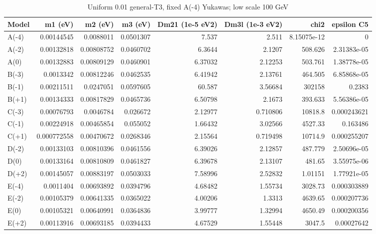 \begin{table}[htbp]
\centering
\small
\caption{Uniform 0.01 general-T3, fixed A(-4) Yukawas; low scale 100 GeV}
\label{tab:table_C2_Am4}
\begin{tabular}{lrrrrrrr}
\hline
Model & m1 (eV) & m2 (eV) & m3 (eV) & Dm21 (1e-5 eV2) & Dm3l (1e-3 eV2) & chi2 & epsilon C5 \\
\hline
A(-4) & 0.00144545 & 0.0088011 & 0.0501307 & 7.537 & 2.511 & 8.15075e-12 & 0 \\
A(-2) & 0.00132818 & 0.00808752 & 0.0460702 & 6.3644 & 2.1207 & 508.626 & 2.31383e-05 \\
A(0) & 0.00132883 & 0.00809129 & 0.0460901 & 6.37032 & 2.12253 & 503.761 & 1.38778e-05 \\
B(-3) & 0.0013342 & 0.00812246 & 0.0462535 & 6.41942 & 2.13761 & 464.505 & 6.85868e-05 \\
B(-1) & 0.00211511 & 0.0247051 & 0.0597605 & 60.587 & 3.56684 & 302158 & 0.2383 \\
B(+1) & 0.00134333 & 0.00817829 & 0.0465736 & 6.50798 & 2.1673 & 393.633 & 5.56386e-05 \\
C(-3) & 0.00076793 & 0.0046784 & 0.026672 & 2.12977 & 0.710806 & 10818.8 & 0.000243621 \\
C(-1) & 0.00224918 & 0.00465854 & 0.055052 & 1.66432 & 3.02566 & 4527.33 & 0.163486 \\
C(+1) & 0.000772558 & 0.00470672 & 0.0268346 & 2.15564 & 0.719498 & 10714.9 & 0.000255207 \\
D(-2) & 0.00133103 & 0.00810396 & 0.0461556 & 6.39026 & 2.12857 & 487.779 & 2.50696e-05 \\
D(0) & 0.00133164 & 0.00810809 & 0.0461827 & 6.39678 & 2.13107 & 481.65 & 3.55975e-06 \\
D(+2) & 0.00145057 & 0.00883197 & 0.0503033 & 7.58996 & 2.52832 & 1.01151 & 1.77921e-05 \\
E(-4) & 0.0011404 & 0.00693892 & 0.0394796 & 4.68482 & 1.55734 & 3028.73 & 0.000303889 \\
E(-2) & 0.00105379 & 0.00641335 & 0.0365022 & 4.00206 & 1.3313 & 4639.65 & 0.000207736 \\
E(0) & 0.00105321 & 0.00640991 & 0.0364836 & 3.99777 & 1.32994 & 4650.49 & 0.000200356 \\
E(+2) & 0.00113916 & 0.00693185 & 0.0394433 & 4.67529 & 1.55448 & 3047.5 & 0.00027642 \\
\hline
\end{tabular}
\end{table}
